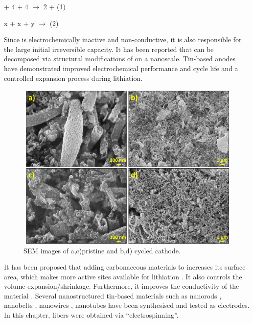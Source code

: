 \begin{center}
 + 4 + 4 $\longrightarrow$ 2 +  (1) 
\end{center}
\begin{center}
x + x + y $\longrightarrow$   (2)
\end{center}

Since  is electrochemically inactive and non-conductive, it is also responsible for the large initial irreversible capacity. It has been reported that  can be decomposed via structural modifications of  on a nanoscale. Tin-based anodes have demonstrated improved electrochemical performance and cycle life and a controlled expansion process during lithiation.  

\begin{figure}[th!]
\centering
\includegraphics[width=\textwidth]{Figures/chap6fig/SnO2SEM}
\caption{SEM images of a,c)pristine and b,d) cycled  cathode.}
\label{Figures/chap6fig:SnO2SEM}
\end{figure}

It has been proposed that adding carbonaceous materials to  increases its surface area, which makes more active sites available for lithiation \cite{navarro}. It also controls the volume expansion/shrinkage. Furthermore, it improves the conductivity of the material \cite{nowak_composites_2018}. Several nanostructured tin-based materials such as nanorods \cite{liu_direct_2009}, nanobelts \cite{duan_single_2005}, nanowires \cite{huang_situ_2010}, nanotubes \cite{wang_large-scale_2011} have been synthesised and tested as electrodes. In this chapter,  fibers were obtained via  \enquote{electrospinning}. 

